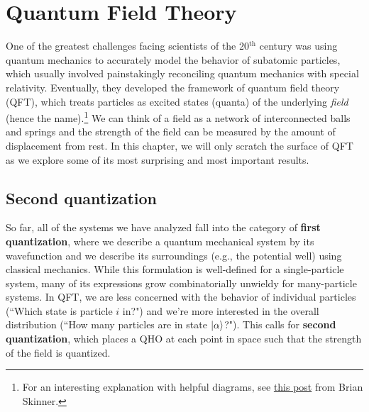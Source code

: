 

%

\chapter{Quantum Field Theory} \label{ch:qft}
One of the greatest challenges facing scientists of the 20$^{\text{th}}$ century was using quantum mechanics to accurately model the behavior of subatomic particles, which usually involved painstakingly reconciling quantum mechanics with special relativity. 
Eventually, they developed the framework of quantum field theory (QFT), which treats particles as excited states (quanta) of the underlying \emph{field} (hence the name).\footnote{For an interesting explanation with helpful diagrams, see \href{https://www.ribbonfarm.com/2015/08/20/qft/}{this post} from Brian Skinner.} 
We can think of a field as a network of interconnected balls and springs and the strength of the field can be measured by the amount of displacement from rest. 
In this chapter, we will only scratch the surface of QFT as we explore some of its most surprising and most important results. 


\section{Second quantization}

So far, all of the systems we have analyzed fall into the category of \textbf{first quantization}, where we describe a quantum mechanical system by its wavefunction and we describe its surroundings (e.g., the potential well) using classical mechanics. 
While this formulation is well-defined for a single-particle system, many of its expressions grow combinatorially unwieldy for many-particle systems. 
In QFT, we are less concerned with the behavior of individual particles (``Which state is particle $i$ in?") and we're more interested in the overall distribution (``How many particles are in state $\ket{\alpha}$?"). 
This calls for \textbf{second quantization}, which places a QHO at each point in space such that the strength of the field is quantized. 


